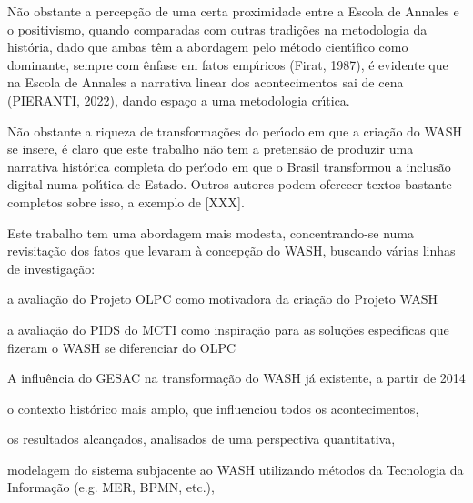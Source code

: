 \documentclass[
12pt,		%
openright,	%
twoside,  %
a4paper,			%
chapter=TITLE,		%
english,			%
french,				%
spanish,			%
brazil				%
]{USPSC-classe/USPSC}
\begin{document}
N\~ao obstante a percep\c{c}\~ao de uma certa proximidade entre a Escola de Annales e o positivismo, quando comparadas com outras tradi\c{c}\~oes na metodologia da hist\'oria, dado que ambas t\^em a abordagem pelo m\'etodo cient\'{\i}fico como dominante, sempre com \^enfase em fatos emp\'{\i}ricos (Firat, 1987), \'e evidente que na Escola de Annales a narrativa linear dos acontecimentos sai de cena (PIERANTI, 2022), dando espa\c{c}o a uma metodologia cr\'{\i}tica.














N\~ao obstante a riqueza de transforma\c{c}\~oes do per\'{\i}odo em que a cria\c{c}\~ao do WASH se insere, \'e claro que este trabalho n\~ao tem a pretens\~ao de produzir uma narrativa hist\'orica completa do per\'{\i}odo em que o Brasil transformou a inclus\~ao digital numa pol\'{\i}tica de Estado. Outros autores podem oferecer textos bastante completos sobre isso, a exemplo de [XXX].














Este trabalho tem uma abordagem mais modesta, concentrando-se numa revisita\c{c}\~ao dos fatos que levaram \`a concep\c{c}\~ao do WASH, buscando v\'arias linhas de investiga\c{c}\~ao:















\begin{alineas}
\item a avalia\c{c}\~ao do Projeto OLPC como motivadora da cria\c{c}\~ao do Projeto WASH
\item a avalia\c{c}\~ao do PIDS do MCTI como inspira\c{c}\~ao para as solu\c{c}\~oes espec\'{\i}ficas que fizeram o WASH se diferenciar do OLPC
\item A influ\^encia do GESAC na transforma\c{c}\~ao do WASH j\'a existente, a partir de 2014
\item o contexto hist\'orico mais amplo, que influenciou todos os acontecimentos,
\item os resultados alcan\c{c}ados, analisados de uma perspectiva quantitativa,
\item modelagem do sistema subjacente ao WASH utilizando m\'etodos da Tecnologia da Informa\c{c}\~ao (e.g. MER, BPMN, etc.),
\end{alineas}
\end{document}
